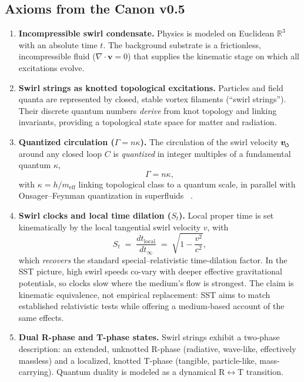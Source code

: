 \documentclass[10pt,reprint,aps,onecolumn,nofootinbib]{revtex4-2}
\newcommand{\vect}[1]{\boldsymbol{#1}} %
\newcommand{\vv}{\vect{v}}
\begin{document}
        \subsection*{Axioms from the Canon v0.5}
            \begin{enumerate}
            \item \textbf{Incompressible swirl condensate.} Physics is modeled on Euclidean $\mathbb{R}^3$ with an absolute time $t$. The background substrate is a frictionless, incompressible fluid ($\nabla \cdot \vv=0$) that supplies the kinematic stage on which all excitations evolve.

            \item \textbf{Swirl strings as knotted topological excitations.} Particles and field quanta are represented by closed, stable vortex filaments (``swirl strings''). Their discrete quantum numbers \emph{derive} from knot topology and linking invariants, providing a topological state space for matter and radiation.

            \item \textbf{Quantized circulation ($\Gamma=n\kappa$).} The circulation of the swirl velocity $\vect{v}_{\mkern-2mu\scriptscriptstyle\boldsymbol{\circlearrowleft}}$ around any closed loop $C$ is \emph{quantized} in integer multiples of a fundamental quantum $\kappa$,
            \[
                \Gamma = n\kappa,
            \]
            with $\kappa=h/m_{\mathrm{eff}}$ linking topological class to a quantum scale, in parallel with Onsager–Feynman quantization in superfluids~ \cite{Onsager1949}.

            \item \textbf{Swirl clocks and local time dilation ($S_t$).} Local proper time is set kinematically by the local tangential swirl velocity $v$, with
            \begin{equation}
            S_t \;=\; \frac{dt_\text{local}}{dt_\infty} \;=\; \sqrt{1-\frac{v^2}{c^2}},
            \label{eq:swirlclock}
            \end{equation}
            which \emph{recovers} the standard special–relativistic time-dilation factor. In the SST picture, high swirl speeds co-vary with deeper effective gravitational potentials, so clocks slow where the medium’s flow is strongest. The claim is kinematic equivalence, not empirical replacement: SST aims to match established relativistic tests while offering a medium-based account of the same effects.

            \item \textbf{Dual R-phase and T-phase states.} Swirl strings exhibit a two-phase description: an extended, unknotted R-phase (radiative, wave-like, effectively massless) and a localized, knotted T-phase (tangible, particle-like, mass-carrying). Quantum duality is modeled as a dynamical R$\leftrightarrow$T transition.


\end{enumerate}
\end{document}

